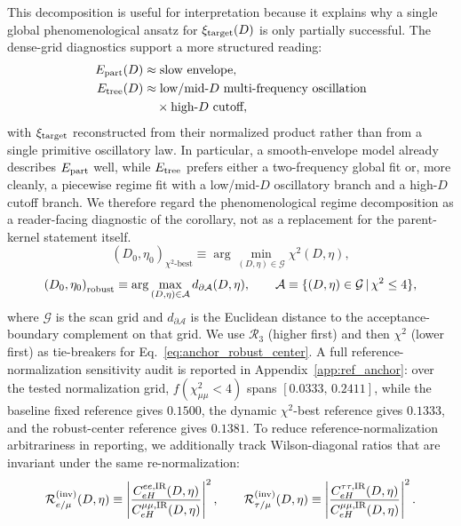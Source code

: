 \documentclass[aps,prd,onecolumn,notitlepage,nofootinbib,superscriptaddress,11pt,floatfix]{revtex4-2}
\begin{document}
This decomposition is useful for interpretation because it explains why a single global phenomenological ansatz for \(\xi_{\rm target}(D)\) is only partially successful. The dense-grid diagnostics support a more structured reading:
\[
\begin{aligned}
E_{\rm part}(D)&\approx \text{slow envelope},\\
E_{\rm tree}(D)&\approx \text{low/mid-}D\ \text{multi-frequency oscillation}\\
&\quad\times \text{high-}D\ \text{cutoff},
\end{aligned}
\]
with \(\xi_{\rm target}\) reconstructed from their normalized product rather than from a single primitive oscillatory law. In particular, a smooth-envelope model already describes \(E_{\rm part}\) well, while \(E_{\rm tree}\) prefers either a two-frequency global fit or, more cleanly, a piecewise regime fit with a low/mid-\(D\) oscillatory branch and a high-\(D\) cutoff branch. We therefore regard the phenomenological regime decomposition as a reader-facing diagnostic of the corollary, not as a replacement for the parent-kernel statement itself.
\begin{equation}
\left(D_0,\eta_0\right)_{\chi^2\text{-best}}
\equiv
\arg\min_{(D,\eta)\in\mathcal{G}} \chi^2(D,\eta),
\label{eq:anchor_chi2_best}
\end{equation}
\begin{equation}
\left(D_0,\eta_0\right)_{\rm robust}
\equiv
\arg\max_{(D,\eta)\in\mathcal{A}} d_{\partial\mathcal{A}}(D,\eta),
\qquad
\mathcal{A}\equiv\{(D,\eta)\in\mathcal{G}\,|\,\chi^2\le 4\},
\label{eq:anchor_robust_center}
\end{equation}
where $\mathcal{G}$ is the scan grid and $d_{\partial\mathcal{A}}$ is the Euclidean distance to the acceptance-boundary complement on that grid. We use $\mathcal{R}_3$ (higher first) and then $\chi^2$ (lower first) as tie-breakers for Eq.~\eqref{eq:anchor_robust_center}. A full reference-normalization sensitivity audit is reported in Appendix~\ref{app:ref_anchor}: over the tested normalization grid, $f(\chi^2_{\mu\mu}<4)$ spans $[0.0333,\,0.2411]$, while the baseline fixed reference gives $0.1500$, the dynamic $\chi^2$-best reference gives $0.1333$, and the robust-center reference gives $0.1381$.
To reduce reference-normalization arbitrariness in reporting, we additionally track Wilson-diagonal ratios that are invariant under the same re-normalization:
\begin{equation}
\mathcal{R}_{e/\mu}^{\rm(inv)}(D,\eta)\equiv \left|\frac{C_{eH}^{ee,{\rm IR}}(D,\eta)}{C_{eH}^{\mu\mu,{\rm IR}}(D,\eta)}\right|^2,\qquad
\mathcal{R}_{\tau/\mu}^{\rm(inv)}(D,\eta)\equiv \left|\frac{C_{eH}^{\tau\tau,{\rm IR}}(D,\eta)}{C_{eH}^{\mu\mu,{\rm IR}}(D,\eta)}\right|^2.
\label{eq:anchor_invariant_ratios}
\end{equation}
\end{document}
